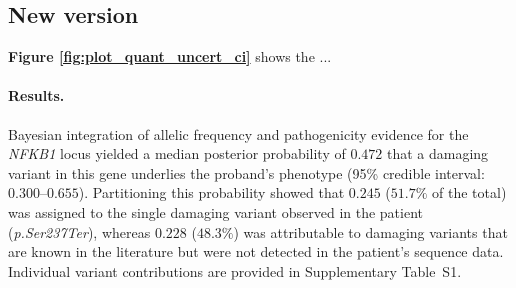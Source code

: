 \begin{table}[ht]
\centering
\caption{Final Variant Results for Patient (XL LOF)}
\label{tab:final_variant_report}
\end{table}




\subsection{New version}

\textbf{Figure \ref{fig:plot_quant_uncert_ci}} shows the ...


\paragraph{Results.}
Bayesian integration of allelic frequency and pathogenicity evidence for the \textit{NFKB1} locus yielded a median posterior probability of $0.472$ that a damaging variant in this gene underlies the proband’s phenotype (95\% credible interval: $0.300$–$0.655$).  Partitioning this probability showed that $0.245$ ($51.7\%$ of the total) was assigned to the single damaging variant observed in the patient (\textit{p.Ser237Ter}), whereas $0.228$ ($48.3\%$) was attributable to damaging variants that are known in the literature but were not detected in the patient’s sequence data.  Individual variant contributions are provided in Supplementary Table~S1.


